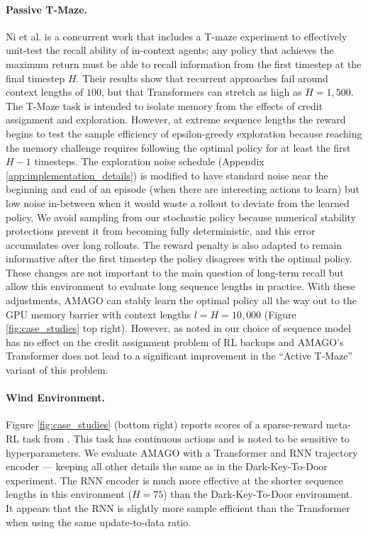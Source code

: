 \documentclass{article}
\begin{document}
\paragraph{Passive T-Maze.} Ni et al. \cite{ni2023transformers} is a concurrent work that includes a T-maze experiment to effectively unit-test the recall ability of in-context agents; any policy that achieves the maximum return must be able to recall information from the first timestep at the final timestep $H$. Their results show that recurrent approaches fail around context lengths of $100$, but that Transformers can stretch as high as $H = 1,500$. The T-Maze task is intended to isolate memory from the effects of credit assignment and exploration. However, at extreme sequence lengths the reward begins to test the sample efficiency of epsilon-greedy exploration because reaching the memory challenge requires following the optimal policy for at least the first $H - 1$ timesteps. The exploration noise schedule (Appendix \ref{app:implementation_details}) is modified to have standard noise near the beginning and end of an episode (when there are interesting actions to learn) but low noise in-between when it would waste a rollout to deviate from the learned policy. We avoid sampling from our stochastic policy because numerical stability protections prevent it from becoming fully deterministic, and this error accumulates over long rollouts. The reward penalty is also adapted to remain informative after the first timestep the policy disagrees with the optimal policy. These changes are not important to the main question of long-term recall but allow this environment to evaluate long sequence lengths in practice. With these adjustments, AMAGO can stably learn the optimal policy all the way out to the GPU memory barrier with context lengths $l = H = 10,000$ (Figure \ref{fig:case_studies} top right). However, as noted in \cite{ni2023transformers} our choice of sequence model has no effect on the credit assignment problem of RL backups and AMAGO's Transformer does not lead to a significant improvement in the ``Active T-Maze'' variant of this problem.
\paragraph{Wind Environment.} Figure \ref{fig:case_studies} (bottom right) reports scores of a sparse-reward meta-RL task from \cite{ni2022recurrent}. This task has continuous actions and is noted to be sensitive to hyperparameters. We evaluate AMAGO with a Transformer and RNN trajectory encoder --- keeping all other details the same as in the Dark-Key-To-Door experiment. The RNN encoder is much more effective at the shorter sequence lengths in this environment ($H = 75$) than the Dark-Key-To-Door environment. It appears that the RNN is slightly more sample efficient than the Transformer when using the same update-to-data ratio.
\end{document}
